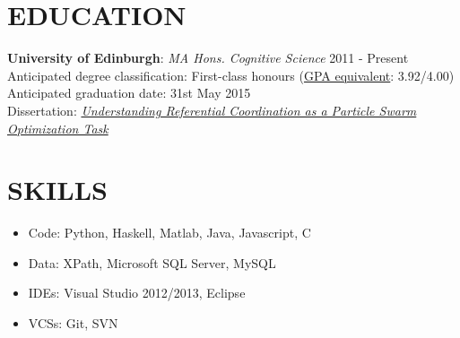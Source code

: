 \documentclass[line, margin]{res}
\newcommand{\CS}{C\nolinebreak\hspace{-.05em}\raisebox{.6ex}{\scriptsize\bf \#}}
\begin{document}
\address{24 Lutton Place, Edinburgh, Scotland EH8 9PE | +44 771 966 3016 | chase@chasestevens.com}

\begin{resume}
\section{EDUCATION}
\textbf{University of Edinburgh}: \textit{MA Hons. Cognitive Science} \hfill 2011 - Present\\
Anticipated degree classification: First-class honours (\href{http://www.ed.ac.uk/schools-departments/humanities-soc-sci/visiting-exchange/academic-support/credits-grading}{GPA equivalent}: 3.92/4.00)\\
Anticipated graduation date: 31st May 2015\\
Dissertation: \textit{\href{http://www.chasestevens.com/papers/undergrad_dissertation.pdf}{Understanding Referential Coordination as a Particle Swarm Optimization Task}}

\section{SKILLS}
\begin{itemize}[leftmargin=10pt]
\item Code: Python, Haskell, Matlab, Java, Javascript, \CS
\item Data: XPath, Microsoft SQL Server, MySQL
\item IDEs: Visual Studio 2012/2013, Eclipse
\item VCSs: Git, SVN
\end{itemize}


\end{resume}
\end{document}
